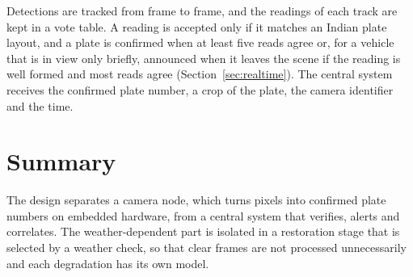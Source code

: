 Detections are tracked from frame to frame, and the readings of each track are
kept in a vote table. A reading is accepted only if it matches an Indian plate
layout, and a plate is confirmed when at least five reads agree or, for a
vehicle that is in view only briefly, announced when it leaves the scene if the
reading is well formed and most reads agree
(Section~\ref{sec:realtime}). The central system receives the confirmed plate
number, a crop of the plate, the camera identifier and the time.

\section{Summary}

The design separates a camera node, which turns pixels into confirmed plate
numbers on embedded hardware, from a central system that verifies, alerts and
correlates. The weather-dependent part is isolated in a restoration stage that
is selected by a weather check, so that clear frames are not processed
unnecessarily and each degradation has its own model.
